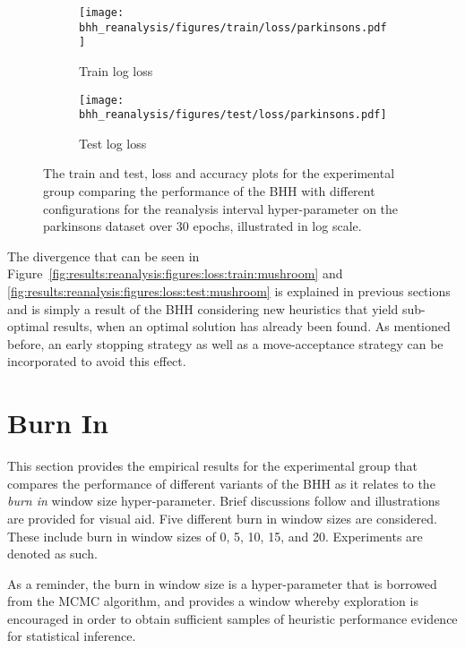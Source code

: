 \begin{figure}[htbp]
      \begin{subfigure}{0.5\textwidth}
            \centering
            \texttt{[image: bhh\_reanalysis/figures/train/loss/parkinsons.pdf]}
            \caption{Train log loss}
            \label{fig:results:reanalysis:figures:loss:train:parkinsons}
      \end{subfigure}
      \begin{subfigure}{0.5\textwidth}
            \centering
            \texttt{[image: bhh\_reanalysis/figures/test/loss/parkinsons.pdf]}
            \caption{Test log loss}
            \label{fig:results:reanalysis:figures:loss:test:parkinsons}
      \end{subfigure}
      \par\bigskip
      \caption{The train and test, loss and accuracy plots for the experimental group comparing the performance of the \acs{BHH} with different configurations for the reanalysis interval hyper-parameter on the parkinsons dataset over 30 epochs, illustrated in log scale.}
      \label{fig:results:reanalysis:figures:parkinsons}
\end{figure}

The divergence that can be seen in Figure~\ref{fig:results:reanalysis:figures:loss:train:mushroom} and \ref{fig:results:reanalysis:figures:loss:test:mushroom} is explained in previous sections and is simply a result of the \acs{BHH} considering new heuristics that yield sub-optimal results, when an optimal solution has already been found. As mentioned before, an early stopping strategy as well as a move-acceptance strategy can be incorporated to avoid this effect.

\section{Burn In}\label{sec:results:burn_in}

This section provides the empirical results for the experimental group that compares the performance of different variants of the \acs{BHH} as it relates to the \textit{burn in} window size hyper-parameter. Brief discussions follow and illustrations are provided for visual aid. Five different burn in window sizes are considered. These include burn in window sizes of 0, 5, 10, 15, and 20. Experiments are denoted as such.

As a reminder, the burn in window size is a hyper-parameter that is borrowed from the \acs{MCMC} algorithm, and provides a window whereby exploration is encouraged in order to obtain sufficient samples of heuristic performance evidence for statistical inference.

